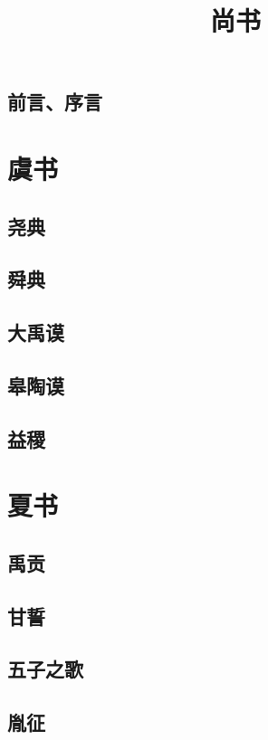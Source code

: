 \documentclass[a4paper,12pt,UTF8,twoside]{ctexbook}
\title{\heiti\zihao{0} 尚书}
\author{}
\date{}
\begin{document}
\maketitle
\tableofcontents

\frontmatter
\chapter{前言、序言}

\mainmatter

\part{虞书}

\chapter{尧典}
\chapter{舜典}
\chapter{大禹谟}
\chapter{皋陶谟}
\chapter{益稷}


\part{夏书}

\chapter{禹贡}
\chapter{甘誓}
\chapter{五子之歌}
\chapter{胤征}
\end{document}

